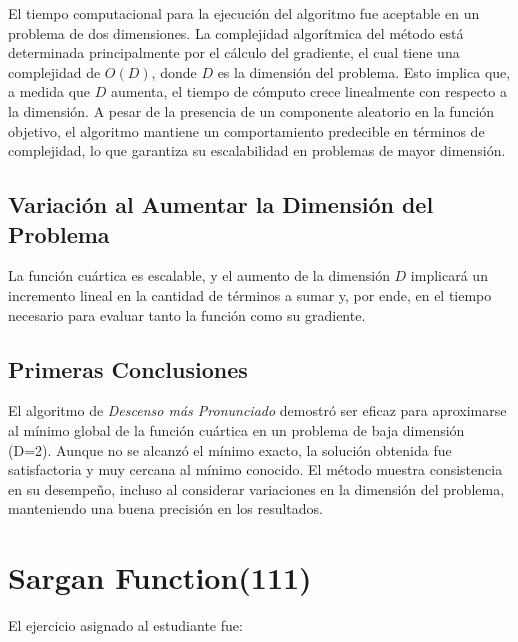 \documentclass{article}
\begin{document}
	El tiempo computacional para la ejecución del algoritmo fue aceptable en un problema de dos dimensiones. La complejidad algorítmica del método está determinada principalmente por el cálculo del gradiente, el cual tiene una complejidad de $O(D)$, donde $D$ es la dimensión del problema. Esto implica que, a medida que $D$ aumenta, el tiempo de cómputo crece linealmente con respecto a la dimensión. A pesar de la presencia de un componente aleatorio en la función objetivo, el algoritmo mantiene un comportamiento predecible en términos de complejidad, lo que garantiza su escalabilidad en problemas de mayor dimensión.
	
	
	\subsection{Variación al Aumentar la Dimensión del Problema}
	
	La función cuártica es escalable, y el aumento de la dimensión $D$ implicará un incremento lineal en la cantidad de términos a sumar y, por ende, en el tiempo necesario para evaluar tanto la función como su gradiente.
	
	\subsection{Primeras Conclusiones}
	
	El algoritmo de \textit{Descenso más Pronunciado} demostró ser eficaz para aproximarse al mínimo global de la función cuártica en un problema de baja dimensión (D=2). Aunque no se alcanzó el mínimo exacto, la solución obtenida fue satisfactoria y muy cercana al mínimo conocido. El método muestra consistencia en su desempeño, incluso al considerar variaciones en la dimensión del problema, manteniendo una buena precisión en los resultados.

		
	
	\section{Sargan Function(111)}
	
	El ejercicio asignado al estudiante fue:
	
	\vspace*{1cm}
	
	
\end{document}
